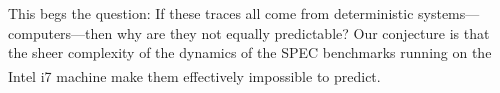 %



%
This begs the question: If these traces all come from deterministic
systems---computers---then why are they not equally predictable?  Our
conjecture is that the sheer complexity of the dynamics of the SPEC
benchmarks running on the Intel i7\textsuperscript{\textregistered}
machine make them effectively impossible to predict.



